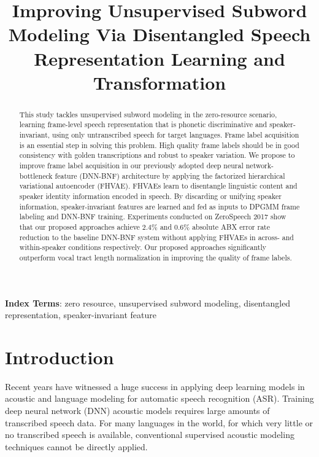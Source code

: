 \documentclass[a4paper]{article}
\title{Improving Unsupervised Subword Modeling Via Disentangled Speech Representation Learning and Transformation}
\begin{document}
\maketitle
% 
\begin{abstract}
This study tackles unsupervised subword modeling in the zero-resource scenario, learning frame-level speech representation that is phonetic discriminative and speaker-invariant, using only untranscribed speech for target languages. Frame label acquisition is an essential step in solving this problem. High quality frame labels  should be in good consistency with golden transcriptions and robust to speaker variation. We propose to improve frame label acquisition in our previously adopted deep neural network-bottleneck feature (DNN-BNF) architecture by applying the factorized hierarchical variational autoencoder (FHVAE). FHVAEs learn to disentangle linguistic content and speaker identity information encoded in speech. By discarding or unifying speaker information, speaker-invariant features are learned and fed as inputs to DPGMM frame labeling and DNN-BNF training. Experiments conducted on ZeroSpeech 2017 show that our proposed approaches achieve $2.4\%$ and $0.6\%$ absolute ABX error rate reduction to the baseline DNN-BNF system without applying FHVAEs in across- and within-speaker conditions respectively. Our proposed approaches significantly outperform vocal tract length normalization in improving the quality of frame labels.

\end{abstract}
\noindent\textbf{Index Terms}: zero resource, unsupervised subword modeling, disentangled representation, speaker-invariant feature

\section{Introduction}
Recent years have witnessed a huge success in applying deep learning  models in acoustic and language modeling for automatic speech recognition (ASR). 
Training  deep neural network (DNN) acoustic models  requires large amounts of transcribed speech data. 
For many languages in the world, for which very little or no transcribed speech is available, conventional supervised acoustic modeling techniques cannot be  directly applied.
\end{document}
